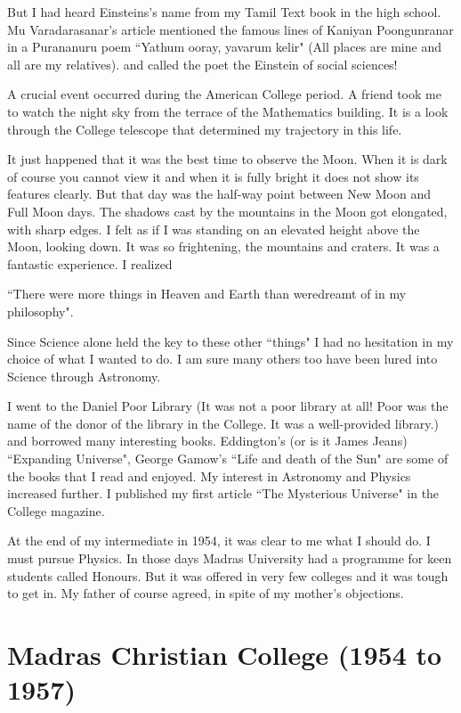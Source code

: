 But I had heard Einsteins's name from my Tamil Text book in the high 
school. Mu Varadarasanar's article mentioned the famous lines of Kaniyan 
Poongunranar in a Purananuru poem ``Yathum ooray, yavarum kelir"
(All places are mine and all are my relatives).
and called the poet the Einstein of social sciences!   


A crucial event occurred during the American College period. A friend 
took me to watch the night sky from the terrace of the Mathematics 
building. It is a look through the College telescope that determined my 
trajectory in this life.


It just happened that it was the best time to observe the Moon. When it 
is dark of course you cannot view it and when it is fully bright it does 
not show its features clearly. But that day was the half-way point 
between New Moon and Full Moon days. The shadows cast by the mountains 
in the Moon got elongated, with sharp edges. I felt as if I was standing 
on an elevated height above the Moon, looking down. It was so 
frightening, the mountains and craters. It was a fantastic experience. I 
realized


``There were more things in Heaven and Earth than were\break dreamt of in my 
philosophy".


Since Science alone held the key to these other ``things" I had no 
hesitation in my choice of what I wanted to do. I am sure many others 
too have been lured into Science through Astronomy.


I went to the Daniel Poor Library (It was not a poor library at all! 
Poor was the name of the donor of the library in the College. It was a 
well-provided library.) and borrowed many interesting books. Eddington's 
(or is it James Jeans) ``Expanding Universe", George Gamow's ``Life and 
death of the Sun" are some of the books that I read and enjoyed. My 
interest in Astronomy and Physics increased further. I published my 
first article ``The Mysterious Universe" in the College magazine.

At the end of my intermediate in 1954, it was clear to me what I should 
do. I must pursue Physics. In those days Madras University had a 
programme for keen students called Honours. But it was offered in very 
few colleges and it was tough to get in. My father of course agreed, 
in spite of my mother's objections.

\section*{Madras Christian College (1954 to 1957)}

